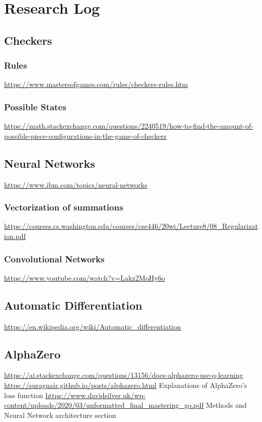 \documentclass{article}
\begin{document}
    \section{Research Log}

    \subsection{Checkers}
    \subsubsection{Rules}
    \noindent \url{https://www.mastersofgames.com/rules/checkers-rules.htm}
    \subsubsection{Possible States}
    \noindent \url{https://math.stackexchange.com/questions/2240519/how-to-find-the-amount-of-possible-piece-configurations-in-the-game-of-checkers}
    
    \subsection{Neural Networks}
    \noindent \url{https://www.ibm.com/topics/neural-networks}

    \subsubsection{Vectorization of summations}
    \noindent \url{https://courses.cs.washington.edu/courses/cse446/20wi/Lecture8/08_Regularization.pdf}

    \subsubsection{Convolutional Networks}
    \noindent \url{https://www.youtube.com/watch?v=Lakz2MoHy6o}\\

    \subsection{Automatic Differentiation}
    \noindent \url{https://en.wikipedia.org/wiki/Automatic_differentiation}

    \subsection{AlphaZero}
    \noindent \url{https://ai.stackexchange.com/questions/13156/does-alphazero-use-q-learning}
    \noindent \url{https://suragnair.github.io/posts/alphazero.html}
    Explanations of AlphaZero's loss function
    \noindent \url{https://www.davidsilver.uk/wp-content/uploads/2020/03/unformatted_final_mastering_go.pdf} Methods and Neural Network architecture section
\end{document}
